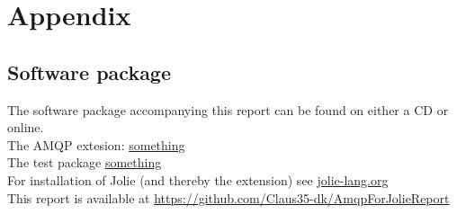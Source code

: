 \section{Appendix}
\subsection{Software package}
The software package accompanying this report can be found on either a CD or online.\\
The AMQP extesion:
\url{something}\\
The test package
\url{something}\\
For installation of Jolie (and thereby the extension) see \url{jolie-lang.org}\\
This report is available at \url{https://github.com/Claus35-dk/AmqpForJolieReport}
\newpage